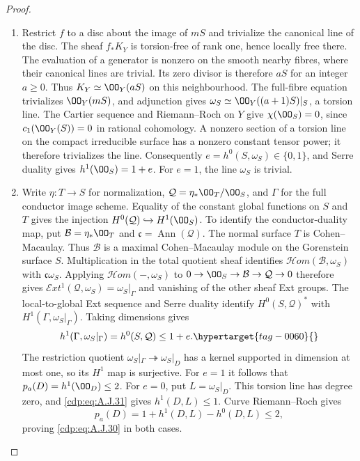\begin{proof}

\begin{enumerate}[label={$\langle1\rangle$\arabic*.},leftmargin=*]
\item Restrict $f$ to a disc about the image of $mS$ and trivialize the
canonical line of the disc. The sheaf $f_*K_Y$ is torsion-free of rank
one, hence locally free there. The evaluation of a generator is
nonzero on the smooth nearby fibres, where their canonical lines are
trivial. Its zero divisor is therefore $aS$ for an integer $a\ge0$.
Thus $K_Y\simeq\OO_Y(aS)$ on this neighbourhood. The full-fibre equation
trivializes $\OO_Y(mS)$, and adjunction gives
$\omega_S\simeq\OO_Y((a+1)S)|_S$, a torsion line.
The Cartier sequence and Riemann--Roch on $Y$ give $\chi(\OO_S)=0$,
since $c_1(\OO_Y(S))=0$ in rational cohomology. A nonzero section of a
torsion line on the compact irreducible surface has a nonzero constant
tensor power; it therefore trivializes the line. Consequently
$e=h^0(S,\omega_S)\in\{0,1\}$, and Serre duality gives
$h^1(\OO_S)=1+e$. For $e=1$, the line $\omega_S$ is trivial.

\item Write $\eta:T\to S$ for normalization,
$\mathcal Q=\eta_*\OO_T/\OO_S$, and $\Gamma$ for
the full conductor image scheme. Equality of the
constant global functions on $S$ and $T$ gives the
injection $H^0(\mathcal Q)\hookrightarrow
H^1(\OO_S)$. To identify the conductor-duality map, put
$\mathcal B=\eta_*\OO_T$ and $\mathfrak c=\operatorname{Ann}(\mathcal Q)$.
The normal surface $T$ is Cohen--Macaulay. Thus $\mathcal B$ is a
maximal Cohen--Macaulay module on the Gorenstein surface $S$.
Multiplication in the total quotient sheaf identifies
$\mathcal Hom(\mathcal B,\omega_S)$ with $\mathfrak c\omega_S$.
Applying $\mathcal Hom(-,\omega_S)$ to
$0\to\OO_S\to\mathcal B\to\mathcal Q\to0$ therefore gives
$\mathcal Ext^1(\mathcal Q,\omega_S)=\omega_S|_\Gamma$ and vanishing
of the other sheaf Ext groups. The local-to-global Ext sequence and
Serre duality identify
$H^0(S,\mathcal Q)^*$ with
$H^1(\Gamma,\omega_S|_\Gamma)$. Taking dimensions gives
\begin{equation}
 h^1(\Gamma,\omega_S|_\Gamma)
       =h^0(S,\mathcal Q)\le1+e.                  \hypertarget{tag-0060}{}\label{cdp:eq:A.J.31}
\end{equation}
The restriction quotient
$\omega_S|_\Gamma\twoheadrightarrow\omega_S|_D$
has a kernel supported in dimension at most one, so
its $H^1$ map is surjective. For $e=1$ it follows that
$p_a(D)=h^1(\OO_D)\le2$. For $e=0$, put
$L=\omega_S|_D$. This torsion line has degree zero,
and \eqref{cdp:eq:A.J.31} gives $h^1(D,L)\le1$. Curve
Riemann--Roch gives
\[
 p_a(D)=1+h^1(D,L)-h^0(D,L)\le2,
\]
proving \eqref{cdp:eq:A.J.30} in both cases.


\end{enumerate}
\end{proof}
